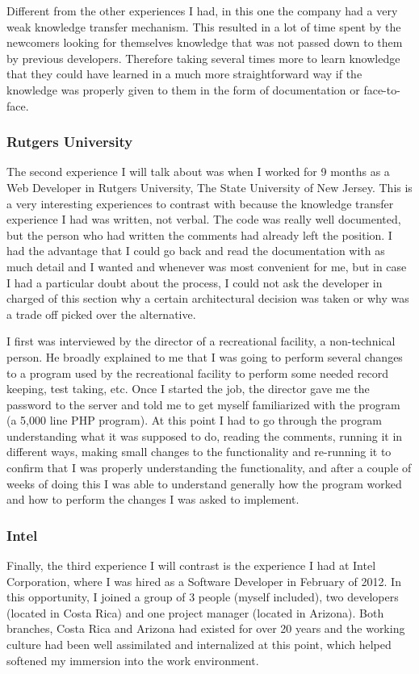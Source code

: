 \documentclass[12pt, letterpaper]{article}
\begin{document}
Different from the other experiences I had, in this one the company had a very weak knowledge transfer mechanism.
This resulted in a lot of time spent by the newcomers looking for themselves knowledge that was not passed down to them
by previous developers. Therefore taking several times more to learn knowledge that they could have learned in a much
more straightforward way if the knowledge was properly given to them in the form of documentation or face-to-face.

\subsubsection{Rutgers University}
The second experience I will talk about was when I worked for 9 months as a Web Developer in Rutgers University, The
State University of New Jersey. This is a very interesting experiences to contrast with because the knowledge 
transfer experience I had was written, not verbal. The code was really well documented, but the person who had 
written the comments had already left the position. I had the advantage that I could go back and read the 
documentation with as much detail and I wanted and whenever was most convenient for me, but in case I had a
particular doubt about the process, I could not ask the developer in charged of this section why a certain
architectural decision was taken or why was a trade off picked over the alternative.

I first was interviewed by the director of a recreational facility, a non-technical person. He broadly 
explained to me that I was going to 
perform several changes to a program used by the recreational facility to perform some needed record keeping,
test taking, etc. Once I started the job, the director gave me the password to the server and told me to 
get myself familiarized with the program (a 5,000 line PHP program). At this point I had to go through
the program understanding what it was supposed to do, reading the comments, running it in different ways, making small 
changes to the 
functionality and re-running it to confirm that I was properly understanding the functionality, and after a couple of 
weeks of doing this I was able to understand generally how the program worked and how to perform the changes I was asked
to implement.



\subsubsection{Intel}
Finally, the third experience I will contrast is the experience I had at Intel Corporation, where I was hired
as a Software Developer in February of 2012. In this opportunity, I joined a group of 3 people (myself included),
two developers (located in Costa Rica) and one project manager (located in Arizona). Both branches, Costa Rica 
and Arizona had existed for over 20 years and the working culture had been well assimilated and internalized
at this point, which helped softened my immersion into the work environment.
\end{document}
